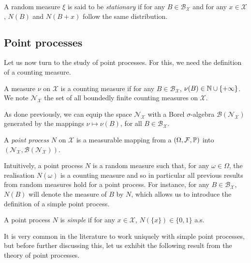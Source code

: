 \begin{definition}
    A random measure $\xi$ is said to be \emph{stationary} if 
    for any $B\in\mathcal{B}_{\mathcal{X}}$ and for any $x\in\mathcal{X}$, $N(B)$ and $N(B+x)$ follow the same distribution.
\end{definition}

\subsection{Point processes}

Let us now turn to the study of point processes. For this, we need the definition of a counting measure.

\begin{definition}
    A measure $\nu$ on $\mathcal{X}$ is a counting measure if for any $B\in\mathcal{B}_{\mathcal{X}}$, $\nu(B)\in{\mathbb N} \cup \{+\infty\}$.
    We note $\mathcal{N}_{\mathcal{X}}$ the set of all boundedly finite counting measures on $\mathcal{X}$.
\end{definition}

As done previously, we can equip the space $\mathcal{N}_{\mathcal{X}}$ with a Borel $\sigma$-algebra $\mathcal{B}(\mathcal{N}_{\mathcal{X}})$ generated by the mappings $\nu \mapsto \nu(B)$, for all $B\in\mathcal{B}_{\mathcal{X}}$.

\begin{definition}
    A \emph{point process} $N$ on $\mathcal{X}$ is a measurable mapping from a $(\Omega, \mathcal{F}, {\mathbb P})$ into $(\mathcal{N}_{\mathcal{X}}, \mathcal{B}(\mathcal{N}_{\mathcal{X}}))$.
\end{definition}

Intuitively, a point process $N$ is a random measure \parencite[Corollary 1.6.4.]{Baccelli2020} such that, for any $\omega\in\Omega$, the realisation $N(\omega)$ is a counting measure and so in particular all previous results from random measures hold for a point process.
For instance, for any $B\in\mathcal{B}_{\mathcal{X}}$, $N(B)$ will denote the measure of $B$ by $N$, which allows us to introduce the definition of a simple point process.

\begin{definition}
A point process $N$ is \emph{simple} if for any $x\in\mathcal{X}$, $N(\{x\}) \in \{0, 1\}$ a.s.
\end{definition}

It is very common in the literature to work uniquely with simple point processes, but before further discussing this, let us exhibit the following result from the theory of point processes.

